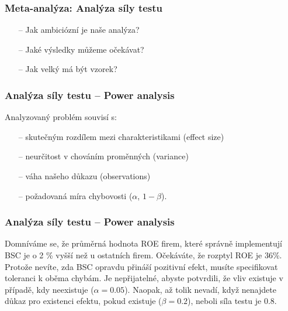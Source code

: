 \documentclass[10pt,xcolor={dvipsnames}]{beamer}
\begin{document}

\begin{frame}
\frametitle{Meta-analýza: Analýza síly testu}
\begin{Large}
\begin{itemize}
\item[--] Jak ambiciózní je naše analýza?
\item[--] Jaké výsledky můžeme očekávat?
\item[--] Jak velký má být vzorek?
\end{itemize}
\end{Large}
\end{frame}


\begin{frame}
\frametitle{Analýza síly testu -- Power analysis}
\begin{large}
Analyzovaný problém souvisí s:
\begin{itemize}
\item[--] skutečným rozdílem mezi charakteristikami (effect size)
\item[--] neurčitost v chováním proměnných (variance)
\item[--] váha našeho důkazu (observations)
\item[--] požadovaná míra chybovosti ($\alpha$, $1-\beta$).
\end{itemize}
\end{large}
\end{frame}


\begin{frame}
\frametitle{Analýza síly testu -- Power analysis}
\begin{large}
Domníváme se, že průměrná hodnota ROE firem, které správně implementují BSC je \textcolor{NavyBlue}{o 2 \%} vyšší než u ostatních firem. Očekáváte, že \textcolor{NavyBlue}{rozptyl ROE je 36\%}. Protože nevíte, zda BSC opravdu přináší pozitivní efekt, musíte specifikovat toleranci k oběma chybám. Je nepřijatelné, abyste potvrdili, že vliv existuje v případě, kdy \textcolor{WildStrawberry}{neexistuje ($\alpha=0.05$)}. Naopak, až tolik nevadí, když nenajdete důkaz pro existenci efektu, \textcolor{WildStrawberry}{pokud existuje ($\beta = 0.2$), neboli síla testu je 0.8}. \newline\smallskip

\end{large}

\end{frame}
\end{document}
